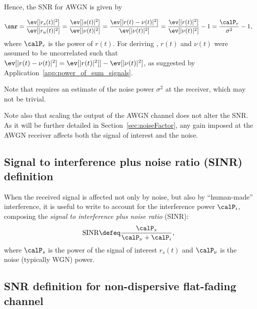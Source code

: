 Hence, the SNR for AWGN is given by
\begin{equation}
\snr = \frac{\ev[|r_s(t)|^2]}{\ev[|r_u(t)|^2]}  = \frac{\ev[|s(t)|^2]}{\ev[|\nu(t)|^2]} = \frac{\ev[|r(t)-\nu(t)|^2]}{\ev[|\nu(t)|^2]}  = \frac{\ev[|r(t)|^2]}{\ev[|\nu(t)|^2]} - 1 = \frac{\calP_r}{\sigma^2} - 1,
\label{eq:snr_awgn}
\end{equation}
where $\calP_r$ is the power of $r(t)$. For deriving , $r(t)$ and $\nu(t)$ were assumed to be uncorrelated such that
$\ev[|r(t)-\nu(t)|^2] = \ev[|r(t)|^2]]- \ev[|\nu(t)|^2]$, as suggested by Application~\ref{app:power_of_sum_signals}.

 Note that  requires an estimate of the noise power $\sigma^2$ at the receiver, which may not be trivial.

Note also that scaling the output of the AWGN channel does not alter the SNR.
As it will be further detailed in Section~\ref{sec:noiseFactor}, any gain imposed at the AWGN receiver affects both the signal of interest and the noise.

\subsection{Signal to interference plus noise ratio (SINR) definition}
\label{sec:sinr}

When the received signal is affected not only by noise, but also by ``human-made'' interference, it is useful to write  to account for the interference power $\calP_i$, composing the \emph{signal to interference plus noise ratio} (SINR):
\begin{equation}
\textrm{SINR} \defeq \frac{\calP_s}{\calP_{\nu} + \calP_i},
\label{eq:sinr}
\end{equation}
where $\calP_s$ is the power of the signal of interest $r_s(t)$ and $\calP_{\nu}$ is the noise (typically WGN) power.

\subsection{SNR definition for non-dispersive flat-fading channel}

